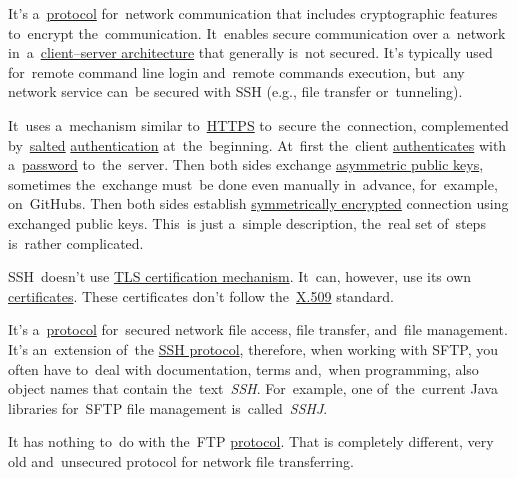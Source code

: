 \label{smtp}

\label{ssh}
It's a~\hyperref[protocolstandard]{protocol} for~network communication that includes cryptographic features to~encrypt the~communication.
It~enables secure communication over a~network in~a~\hyperref[clientserverarchitecture]{client--server architecture} that generally is~not secured.
It's typically used for~remote command line login and~remote commands execution, but~any network service can~be secured with SSH (e.g., file transfer or~tunneling).

It~uses a~mechanism similar to~\hyperref[https]{HTTPS} to~secure the~connection, complemented by~\hyperref[salt]{salted} \hyperref[authenticationauthorization]{authentication} at~the~beginning.
At~first the~client \hyperref[authenticationauthorization]{authenticates} with a~\hyperref[keypassword]{password} to~the~server.
Then both sides exchange \hyperref[asymmetriccryptography]{asymmetric public keys}, sometimes the~exchange must~be done even manually in~advance, for~example, on~GitHubs.
Then both sides establish \hyperref[symmetriccryptography]{symmetrically encrypted} connection using exchanged public keys.
This~is just a~simple description, the~real set of~steps is~rather complicated.

SSH~doesn't use \hyperref[tls]{TLS certification mechanism}.
It~can, however, use its own \hyperref[certificate]{certificates}.
These certificates don't follow the~\hyperref[x509]{\mbox{X.509}} standard.

\label{sftp}
It's a~\hyperref[protocolstandard]{protocol} for~secured network file access, file transfer, and~file management.
It's an~extension of~the \hyperref[ssh]{SSH protocol}, therefore, when working with SFTP, you often have to~deal with documentation, terms and,~when programming, also object names that contain the~text~\textit{SSH}.
For~example, one of~the~current Java libraries for~SFTP file management is~called~\textit{SSHJ}.

\warning It has nothing to~do with the~FTP \hyperref[protocolstandard]{protocol}.
That is completely different, very old and~unsecured protocol for network file transferring.


